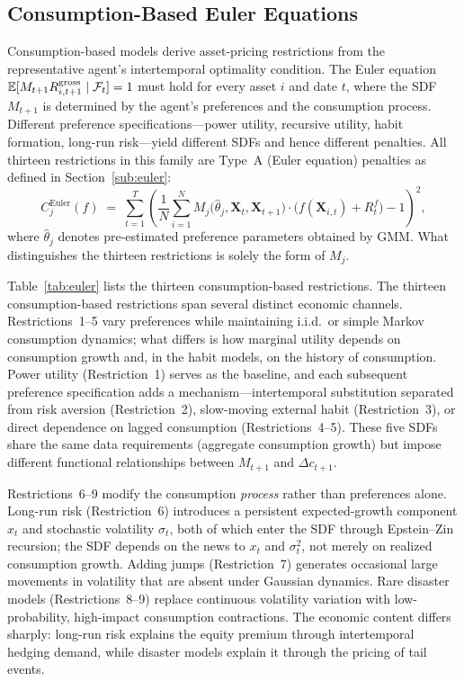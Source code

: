 \subsection{Consumption-Based Euler Equations}\label{sub:euler_restrictions}

Consumption-based models derive asset-pricing restrictions from the representative agent's intertemporal optimality condition.
The Euler equation $\mathbb{E}[M_{t+1} R_{i,t+1}^{\mathrm{gross}} \mid \mathcal{F}_t] = 1$ must hold for every asset $i$ and date $t$, where the SDF $M_{t+1}$ is determined by the agent's preferences and the consumption process.
Different preference specifications---power utility, recursive utility, habit formation, long-run risk---yield different SDFs and hence different penalties.
All thirteen restrictions in this family are Type~A (Euler equation) penalties as defined in Section~\ref{sub:euler}:
\begin{equation}\label{eq:euler_family}
C_j^{\mathrm{Euler}}(f) \;=\;
\sum_{t=1}^{T}
\left(
\frac{1}{N}\sum_{i=1}^{N}
M_j\bigl(\hat{\theta}_j, \mathbf{X}_t, \mathbf{X}_{t+1}\bigr)
\cdot
\bigl(f(\mathbf{X}_{i,t}) + R_t^f\bigr) - 1
\right)^2,
\end{equation}
where $\hat{\theta}_j$ denotes pre-estimated preference parameters obtained by GMM.
What distinguishes the thirteen restrictions is solely the form of $M_j$.

Table~\ref{tab:euler} lists the thirteen consumption-based restrictions. The thirteen consumption-based restrictions span several distinct economic channels.
Restrictions~1--5 vary preferences while maintaining i.i.d.\ or simple Markov consumption dynamics; what differs is how marginal utility depends on consumption growth and, in the habit models, on the history of consumption.
Power utility (Restriction~1) serves as the baseline, and each subsequent preference specification adds a mechanism---intertemporal substitution separated from risk aversion (Restriction~2), slow-moving external habit (Restriction~3), or direct dependence on lagged consumption (Restrictions~4--5).
These five SDFs share the same data requirements (aggregate consumption growth) but impose different functional relationships between $M_{t+1}$ and $\Delta c_{t+1}$.

Restrictions~6--9 modify the consumption \emph{process} rather than preferences alone.
Long-run risk (Restriction~6) introduces a persistent expected-growth component $x_t$ and stochastic volatility $\sigma_t$, both of which enter the SDF through Epstein--Zin recursion; the SDF depends on the news to $x_t$ and $\sigma_t^2$, not merely on realized consumption growth.
Adding jumps (Restriction~7) generates occasional large movements in volatility that are absent under Gaussian dynamics.
Rare disaster models (Restrictions~8--9) replace continuous volatility variation with low-probability, high-impact consumption contractions.
The economic content differs sharply: long-run risk explains the equity premium through intertemporal hedging demand, while disaster models explain it through the pricing of tail events.

